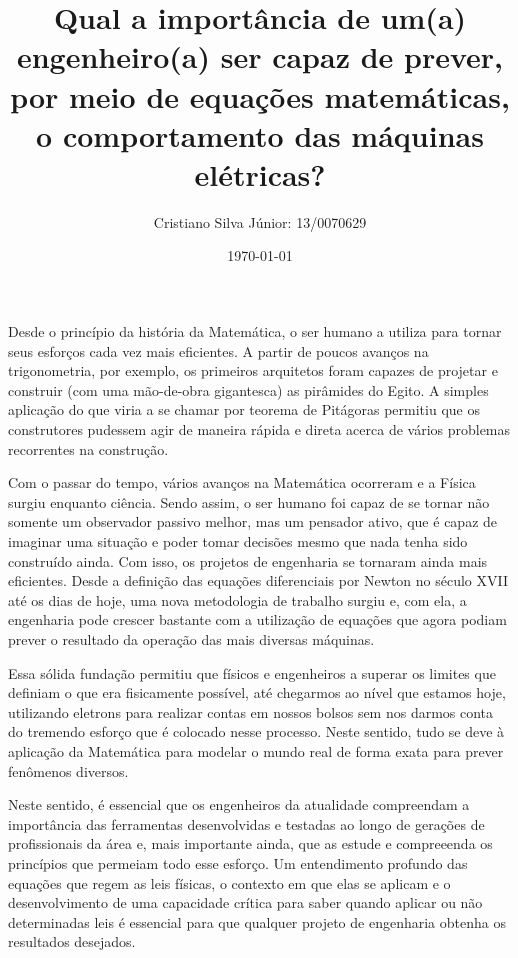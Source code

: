 \documentclass[12pt, a4paper, twoside]{article}
\begin{document}
\title{Qual a importância de um(a) engenheiro(a) ser capaz de prever, por meio
de equações matemáticas, o comportamento das máquinas elétricas?}
\author{Cristiano Silva Júnior: 13/0070629}
\date{\today}
\maketitle

Desde o princípio da história da Matemática, o ser humano a utiliza para tornar
seus esforços cada vez mais eficientes. A partir de poucos avanços na
trigonometria, por exemplo, os primeiros arquitetos foram capazes de projetar e
construir (com uma mão-de-obra gigantesca) as pirâmides do Egito. A simples
aplicação do que viria a se chamar por teorema de Pitágoras permitiu que os
construtores pudessem agir de maneira rápida e direta acerca de vários
problemas recorrentes na construção.

Com o passar do tempo, vários avanços na Matemática ocorreram e a Física
surgiu enquanto ciência. Sendo assim, o ser humano foi capaz de se tornar não
somente um observador passivo melhor, mas um pensador ativo, que é capaz de
imaginar uma situação e poder tomar decisões mesmo que nada tenha sido
construído ainda. Com isso, os projetos de engenharia se tornaram ainda mais
eficientes. Desde a definição das equações diferenciais por Newton no século
XVII até os dias de hoje, uma nova metodologia de trabalho surgiu e, com ela,
a engenharia pode crescer bastante com a utilização de equações que agora
podiam prever o resultado da operação das mais diversas máquinas.

Essa sólida fundação permitiu que físicos e engenheiros a superar os limites
que  definiam o que era fisicamente possível, até chegarmos ao nível que
estamos hoje, utilizando eletrons para realizar contas em nossos bolsos sem
nos darmos conta do tremendo esforço que é colocado nesse processo. Neste
sentido, tudo se deve à aplicação da Matemática para modelar o mundo real de
forma exata para prever fenômenos diversos.

Neste sentido, é essencial que os engenheiros da atualidade compreendam a
importância das ferramentas desenvolvidas e testadas ao longo de gerações de
profissionais da área e, mais importante ainda, que as estude e compreeenda os
princípios que permeiam todo esse esforço. Um entendimento profundo das
equações que regem as leis físicas, o contexto em que elas se aplicam e o
desenvolvimento de uma capacidade crítica para saber quando aplicar ou não
determinadas leis é essencial para que qualquer projeto de engenharia obtenha
os resultados desejados.
\end{document}
